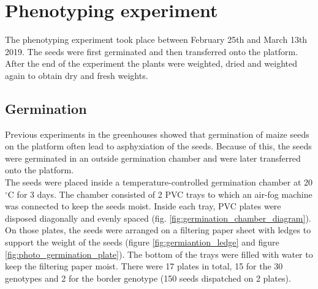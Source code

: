 \section{Phenotyping experiment}
The phenotyping experiment took place between February 25th and March 13th 2019. The seeds were first germinated and then transferred 
onto the platform. After the end of the experiment the plants were weighted, dried and weighted again to obtain dry and fresh 
weights.

\subsection{Germination}
Previous experiments in the greenhouses showed that germination of maize seeds on the platform often lead to asphyxiation of the 
seeds. 
Because of this, the seeds were germinated in an outside germination chamber and were later transferred onto the platform.\\

The seeds were placed inside a temperature-controlled germination chamber at 20$^{\circ}$C for 3 days. The chamber consisted of 2 PVC trays to which an air-fog machine was connected to keep the seeds moist. 
Inside each tray, PVC plates were disposed diagonally and evenly spaced (fig. \ref{fig:germination_chamber_diagram}). On those plates, the seeds were arranged on a filtering paper sheet with ledges to support the weight of the seeds (figure \ref{fig:germiantion_ledge} and figure \ref{fig:photo_germination_plate}). The bottom of the trays were filled with water to keep the filtering paper moist. 
There were 17 plates in total, 15 for the 30 genotypes and 2 for the border genotype (150 seeds dispatched on 2 plates).\\ 

